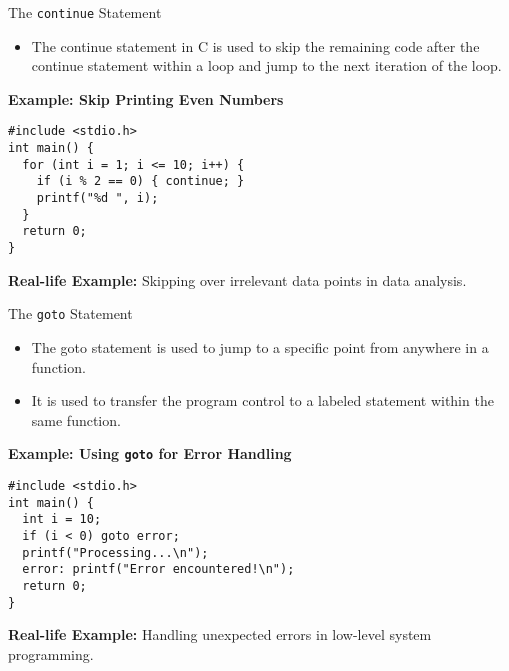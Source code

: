 \documentclass{beamer}
\begin{document}
\begin{frame}{The \texttt{continue} Statement}
    \begin{itemize}
        \item The continue statement in C is used to skip the remaining code after the continue statement within a loop and jump to the next iteration of the loop.
        
    \end{itemize}
    \vspace{0.3cm}
    \textbf{Example: Skip Printing Even Numbers}
    \begin{block}{}
        \texttt{\#include <stdio.h>}\\
        \texttt{int main() \{}\\
        \texttt{\ \ for (int i = 1; i <= 10; i++) \{}\\
        \texttt{\ \ \ \ if (i \% 2 == 0) \{ continue; \}}\\
        \texttt{\ \ \ \ printf("\%d ", i);}\\
        \texttt{\ \ \}}\\
        \texttt{\ \ return 0;}\\
        \texttt{\}}
    \end{block}
    \textbf{Real-life Example:} Skipping over irrelevant data points in data analysis.
\end{frame}

\begin{frame}{The \texttt{goto} Statement}
    \begin{itemize}
        \item The goto statement is used to jump to a specific point from anywhere in a function.
        \item It is used to transfer the program control to a labeled statement within the same function.
    \end{itemize}
    \vspace{0.3cm}
    \textbf{Example: Using \texttt{goto} for Error Handling}
    \begin{block}{}
        \texttt{\#include <stdio.h>}\\
        \texttt{int main() \{}\\
        \texttt{\ \ int i = 10;}\\
        \texttt{\ \ if (i < 0) goto error;}\\
        \texttt{\ \ printf("Processing...\textbackslash n");}\\
        \texttt{\ \ error: printf("Error encountered!\textbackslash n");}\\
        \texttt{\ \ return 0;}\\
        \texttt{\}}
    \end{block}
    \textbf{Real-life Example:} Handling unexpected errors in low-level system programming.
\end{frame}
\end{document}
